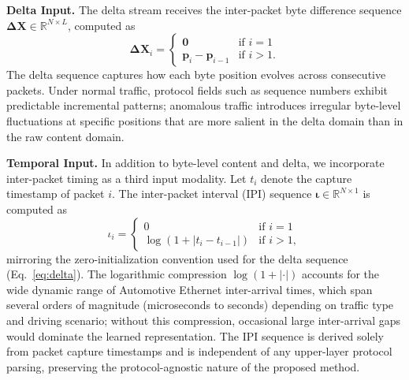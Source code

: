 \noindent\textbf{Delta Input.}
The delta stream receives the inter-packet byte difference sequence $\mathbf{\Delta X} \in \mathbb{R}^{N \times L}$, computed as
\begin{equation}
    \mathbf{\Delta X}_i =
    \begin{cases}
        \mathbf{0} & \text{if } i = 1 \\
        \mathbf{p}_i - \mathbf{p}_{i-1} & \text{if } i > 1.
    \end{cases}
    \label{eq:delta}
\end{equation}
The delta sequence captures how each byte position evolves across consecutive packets. Under normal traffic, protocol fields such as sequence numbers exhibit predictable incremental patterns; anomalous traffic introduces irregular byte-level fluctuations at specific positions that are more salient in the delta domain than in the raw content domain.

\noindent\textbf{Temporal Input.}
In addition to byte-level content and delta, we incorporate inter-packet timing as a third input modality. Let $t_i$ denote the capture timestamp of packet $i$. The inter-packet interval (IPI) sequence $\boldsymbol{\iota} \in \mathbb{R}^{N \times 1}$ is computed as
\begin{equation}
    \iota_i =
    \begin{cases}
        0 & \text{if } i = 1 \\
        \log\!\left(1 + |t_i - t_{i-1}|\right) & \text{if } i > 1,
    \end{cases}
    \label{eq:ipi}
\end{equation}
mirroring the zero-initialization convention used for the delta sequence (Eq.~\eqref{eq:delta}). The logarithmic compression $\log(1+|\cdot|)$ accounts for the wide dynamic range of Automotive Ethernet inter-arrival times, which span several orders of magnitude (microseconds to seconds) depending on traffic type and driving scenario; without this compression, occasional large inter-arrival gaps would dominate the learned representation. The IPI sequence is derived solely from packet capture timestamps and is independent of any upper-layer protocol parsing, preserving the protocol-agnostic nature of the proposed method.

